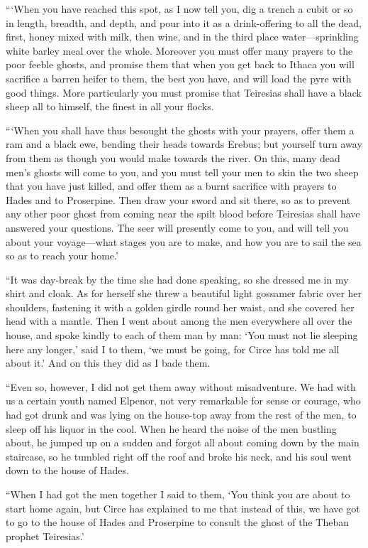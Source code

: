“‘When you have reached this spot, as I now tell you, dig a trench a cubit or
so in length, breadth, and depth, and pour into it as a drink-offering to all
the dead, first, honey mixed with milk, then wine, and in the third place
water—sprinkling white barley meal over the whole. Moreover you must offer many
prayers to the poor feeble ghosts, and promise them that when you get back to
Ithaca you will sacrifice a barren heifer to them, the best you have, and will
load the pyre with good things. More particularly you must promise that
Teiresias shall have a black sheep all to himself, the finest in all your
flocks.

“‘When you shall have thus besought the ghosts with your prayers, offer them a
ram and a black ewe, bending their heads towards Erebus; but yourself turn away
from them as though you would make towards the river. On this, many dead men’s
ghosts will come to you, and you must tell your men to skin the two sheep that
you have just killed, and offer them as a burnt sacrifice with prayers to Hades
and to Proserpine. Then draw your sword and sit there, so as to prevent any
other poor ghost from coming near the spilt blood before Teiresias shall have
answered your questions. The seer will presently come to you, and will tell you
about your voyage—what stages you are to make, and how you are to sail the sea
so as to reach your home.’

“It was day-break by the time she had done speaking, so she dressed me in my
shirt and cloak. As for herself she threw a beautiful light gossamer fabric
over her shoulders, fastening it with a golden girdle round her waist, and she
covered her head with a mantle. Then I went about among the men everywhere all
over the house, and spoke kindly to each of them man by man: ‘You must not lie
sleeping here any longer,’ said I to them, ‘we must be going, for Circe has
told me all about it.’ And on this they did as I bade them.

“Even so, however, I did not get them away without misadventure. We had with us
a certain youth named Elpenor, not very remarkable for sense or courage, who
had got drunk and was lying on the house-top away from the rest of the men, to
sleep off his liquor in the cool. When he heard the noise of the men bustling
about, he jumped up on a sudden and forgot all about coming down by the main
staircase, so he tumbled right off the roof and broke his neck, and his soul
went down to the house of Hades.

“When I had got the men together I said to them, ‘You think you are about to
start home again, but Circe has explained to me that instead of this, we have
got to go to the house of Hades and Proserpine to consult the ghost of the
Theban prophet Teiresias.’

